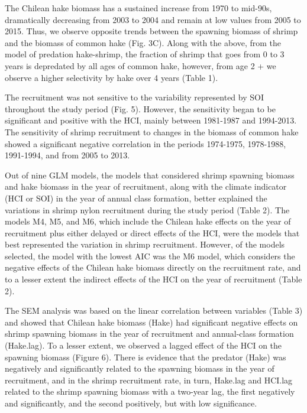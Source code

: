 \documentclass[12pt]{article}
\begin{document}
The Chilean hake biomass has a sustained increase from 1970 to mid-90s,
dramatically decreasing from 2003 to 2004 and remain at low values from
2005 to 2015. Thus, we observe opposite trends between the spawning
biomass of shrimp and the biomass of common hake (Fig. 3C). Along with
the above, from the model of predation hake-shrimp, the fraction of
shrimp that goes from 0 to 3 years is depredated by all ages of common
hake, however, from age 2 + we observe a higher selectivity by hake over
4 years (Table 1).

The recruitment was not sensitive to the variability represented by SOI
throughout the study period (Fig. 5). However, the sensitivity began to
be significant and positive with the HCI, mainly between 1981-1987 and
1994-2013. The sensitivity of shrimp recruitment to changes in the
biomass of common hake showed a significant negative correlation in the
periods 1974-1975, 1978-1988, 1991-1994, and from 2005 to 2013.

Out of nine GLM models, the models that considered shrimp spawning
biomass and hake biomass in the year of recruitment, along with the
climate indicator (HCI or SOI) in the year of annual class formation,
better explained the variations in shrimp nylon recruitment during the
study period (Table 2). The models M4, M5, and M6, which include the
Chilean hake effects on the year of recruitment plus either delayed or
direct effects of the HCI, were the models that best represented the
variation in shrimp recruitment. However, of the models selected, the
model with the lowest AIC was the M6 model, which considers the negative
effects of the Chilean hake biomass directly on the recruitment rate,
and to a lesser extent the indirect effects of the HCI on the year of
recruitment (Table 2).

The SEM analysis was based on the linear correlation between variables
(Table 3) and showed that Chilean hake biomass (Hake) had significant
negative effects on shrimp spawning biomass in the year of recruitment
and annual-class formation (Hake.lag). To a lesser extent, we observed a
lagged effect of the HCI on the spawning biomass (Figure 6). There is
evidence that the predator (Hake) was negatively and significantly
related to the spawning biomass in the year of recruitment, and in the
shrimp recruitment rate, in turn, Hake.lag and HCI.lag related to the
shrimp spawning biomass with a two-year lag, the first negatively and
significantly, and the second positively, but with low significance.

\FloatBarrier
\end{document}
